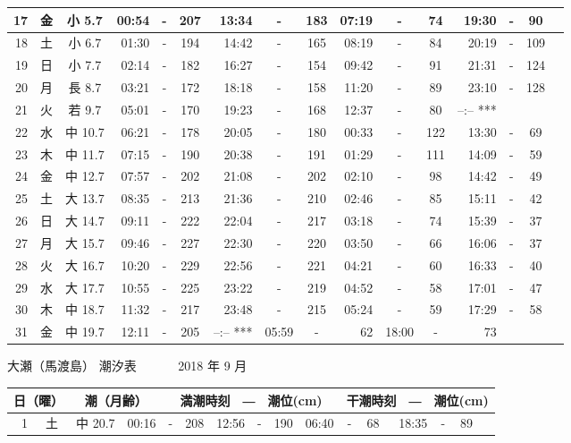 \documentclass[12pt.a4j]{jsarticle}
\begin{document}
\begin{center}
\begin{table}[ht]
\begin{tabular}{|rc|cr|ccrccr|ccrccr|}
\hline
17 & 金 & 小  5.7 & 00:54 &-& 207 & 13:34 &-& 183 & 07:19 &-&  74 & 19:30 &-&  90 \\
\hline
18 & 土 & 小  6.7 & 01:30 &-& 194 & 14:42 &-& 165 & 08:19 &-&  84 & 20:19 &-& 109 \\
\hline
19 & 日 & 小  7.7 & 02:14 &-& 182 & 16:27 &-& 154 & 09:42 &-&  91 & 21:31 &-& 124 \\
\hline
20 & 月 & 長  8.7 & 03:21 &-& 172 & 18:18 &-& 158 & 11:20 &-&  89 & 23:10 &-& 128 \\
\hline
21 & 火 & 若  9.7 & 05:01 &-& 170 & 19:23 &-& 168 & 12:37 &-&  80 & --:--   *** \\
\hline
22 & 水 & 中 10.7 & 06:21 &-& 178 & 20:05 &-& 180 & 00:33 &-& 122 & 13:30 &-&  69 \\
\hline
23 & 木 & 中 11.7 & 07:15 &-& 190 & 20:38 &-& 191 & 01:29 &-& 111 & 14:09 &-&  59 \\
\hline
24 & 金 & 中 12.7 & 07:57 &-& 202 & 21:08 &-& 202 & 02:10 &-&  98 & 14:42 &-&  49 \\
\hline
25 & 土 & 大 13.7 & 08:35 &-& 213 & 21:36 &-& 210 & 02:46 &-&  85 & 15:11 &-&  42 \\
\hline
26 & 日 & 大 14.7 & 09:11 &-& 222 & 22:04 &-& 217 & 03:18 &-&  74 & 15:39 &-&  37 \\
\hline
27 & 月 & 大 15.7 & 09:46 &-& 227 & 22:30 &-& 220 & 03:50 &-&  66 & 16:06 &-&  37 \\
\hline
28 & 火 & 大 16.7 & 10:20 &-& 229 & 22:56 &-& 221 & 04:21 &-&  60 & 16:33 &-&  40 \\
\hline
29 & 水 & 大 17.7 & 10:55 &-& 225 & 23:22 &-& 219 & 04:52 &-&  58 & 17:01 &-&  47 \\
\hline
30 & 木 & 中 18.7 & 11:32 &-& 217 & 23:48 &-& 215 & 05:24 &-&  59 & 17:29 &-&  58 \\
\hline
31 & 金 & 中 19.7 & 12:11 &-& 205 & --:--   *** & 05:59 &-&  62 & 18:00 &-&  73 \\
\hline
\end{tabular}
\end{table}
\newpage
 {\LARGE 大瀬（馬渡島）  潮汐表　　　}
 {\large 2018 年  9 月}\\
 \begin{table}[ht]
 \begin{tabular}{|rc|cr|ccrccr|ccrccr|}
 \hline
 \multicolumn{2}{|c|}{日（曜）} & \multicolumn{2}{c|}{潮（月齢）} & \multicolumn{6}{c|}{満潮時刻　―　潮位(cm)} & \multicolumn{6}{c|}{干潮時刻　―　潮位(cm)} \\
 \hline
 1 & 土 & 中 20.7 & 00:16 &-& 208 & 12:56 &-& 190 & 06:40 &-&  68 & 18:35 &-&  89 \\

\end{tabular}
\end{table}
\end{center}
\end{document}
